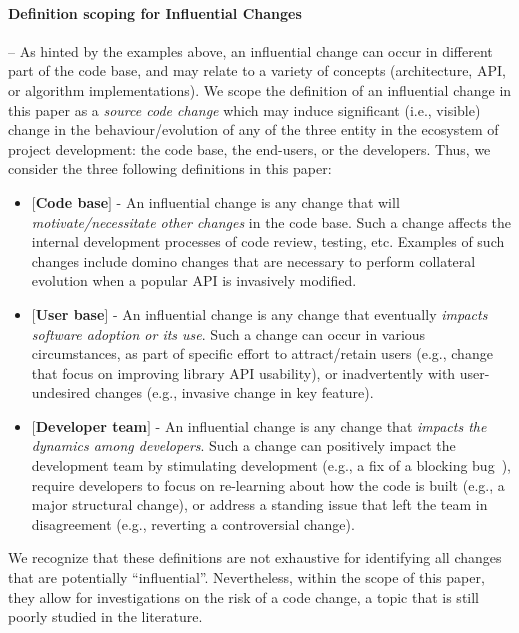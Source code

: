 \paragraph*{\bf Definition scoping for Influential Changes} -- As hinted by the examples above, 
an influential change can occur in different part of the code base, and may relate to a variety
of concepts (architecture, API, or algorithm implementations). We scope the definition of an influential
change in this paper as a {\em source code change} which may induce significant (i.e., visible) change 
in the behaviour/evolution of any of the three entity in the ecosystem of project development: the code base, the end-users, or the developers. Thus, we consider the three following definitions in this paper:
\begin{itemize}
	\item {\bf $[$Code base$]$} - An influential change is any change that will {\em motivate/necessitate other changes} in the code base. Such a change affects the internal development processes of code review, testing, etc. Examples of such changes include domino changes that are necessary to perform collateral evolution when a popular API is invasively modified.
	\item {\bf $[$User base$]$} - An influential change is any change that eventually {\em impacts software adoption or its use}.  Such a change can occur in various circumstances, as part of specific effort to attract/retain users (e.g., change that focus on improving library API usability), or inadvertently with user-undesired changes (e.g., invasive change in key feature).
	\item {\bf $[$Developer team$]$} - An influential change is any change that {\em impacts the dynamics among developers}. Such a change can positively impact the development team by stimulating development (e.g., a fix of a blocking bug~\cite{ValdiviaGarcia:2014:CPB:2597073.2597099}), require developers to focus on re-learning about how the code is built (e.g., a major structural change), or address a standing issue that left the team in disagreement (e.g., reverting a controversial change).
\end{itemize}

We recognize that these definitions are not exhaustive for identifying all changes that are potentially ``influential''. Nevertheless, within the scope of this paper, they allow for investigations on the risk of a code change, a topic that is still poorly studied in the literature.
